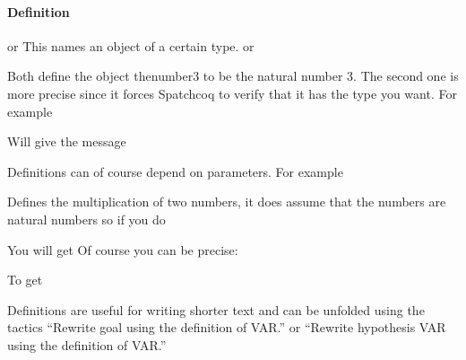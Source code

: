 \paragraph{\bf Definition}{
or 
This names an object of a certain type. 
or 

Both define the object thenumber3 to be the natural number 3. The second one is more precise since it forces Spatchcoq to verify that it has the type you want. For example


Will give the message


Definitions can of course depend on parameters. For example


Defines the multiplication of two numbers, it does assume that the numbers are natural numbers so if you do 


You will get
Of course you can be precise:

     To get
     
     
 Definitions are useful for writing shorter text and can be unfolded using the tactics ``Rewrite goal using the definition of VAR.''
 or ``Rewrite hypothesis VAR using the definition of VAR.''
 
    
     
     }
     
